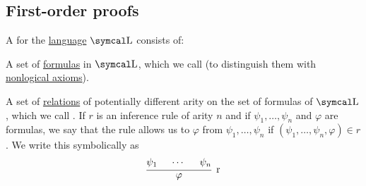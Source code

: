 \subsection{First-order proofs}\label{subsec:first_order_proofs}

\begin{definition}\label{def:first_order_derivation_system}
  A  for the \hyperref[def:first_order_syntax]{language} \( \CL \) consists of:

  \begin{DefEnum}
     A set of \hyperref[def:first_order_syntax]{formulas} in \( \CL \), which we call  (to distinguish them with \hyperref[def:first_order_proofs/axioms_and_theorems]{nonlogical axioms}).

     A set of \hyperref[def:relation]{relations} of potentially different arity on the set of formulas of \( \CL \), which we call . If \( r \) is an inference rule of arity \( n \) and if \( \psi_1, \ldots, \psi_n \) and \( \varphi \) are formulas, we say that the rule allows us to  \( \varphi \) from \( \psi_1, \ldots, \psi_n \) if \( (\psi_1, \ldots, \psi_n, \varphi) \in r \). We write this symbolically as
    \begin{equation*}
      \begin{prooftree}
        \hypo{\psi_1}
        \hypo{\cdots}
        \hypo{\psi_n}
        \infer3[r]{\varphi}
      \end{prooftree}
    \end{equation*}
  \end{DefEnum}
\end{definition}

